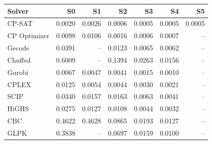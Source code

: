 \begin{tabular}{lrrrrrr}
\toprule
Solver & S0 & S1 & S2 & S3 & S4 & S5 \\
\midrule
CP-SAT & 0.0020 & 0.0026 & 0.0006 & 0.0005 & 0.0005 & 0.0005 \\
CP Optimizer & 0.0098 & 0.0106 & 0.0016 & 0.0006 & 0.0007 & -- \\
Gecode & 0.0391 & -- & 0.0123 & 0.0065 & 0.0062 & -- \\
Chuffed & 0.6009 & -- & 0.1394 & 0.0263 & 0.0156 & -- \\
Gurobi & 0.0067 & 0.0047 & 0.0041 & 0.0015 & 0.0010 & -- \\
CPLEX & 0.0125 & 0.0054 & 0.0044 & 0.0030 & 0.0021 & -- \\
SCIP & 0.0340 & 0.0157 & 0.0163 & 0.0063 & 0.0041 & -- \\
HiGHS & 0.0275 & 0.0127 & 0.0108 & 0.0044 & 0.0032 & -- \\
CBC & 0.4622 & 0.4628 & 0.0865 & 0.0193 & 0.0127 & -- \\
GLPK & 0.3838 & -- & 0.0697 & 0.0159 & 0.0100 & -- \\
\bottomrule
\end{tabular}
